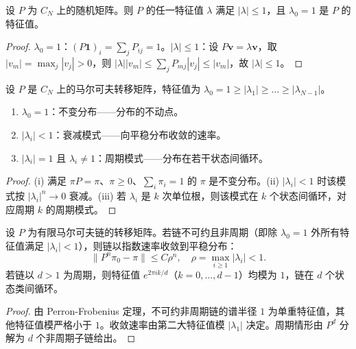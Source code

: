 \begin{lemma}[随机矩阵特征值的谱半径界]\label{ch14_transition_spectral_radius}
设 $P$ 为 $C_N$ 上的随机矩阵。则 $P$ 的任一特征值 $\lambda$ 满足 $|\lambda| \le 1$，且 $\lambda_0 = 1$ 是 $P$ 的特征值。
\end{lemma}

\begin{proof}
$\lambda_0 = 1$：$(P\mathbf{1})_i = \sum_j P_{ij} = 1$。$|\lambda| \le 1$：设 $P\mathbf{v} = \lambda\mathbf{v}$，取 $|v_m| = \max_j |v_j| > 0$，则 $|\lambda||v_m| \le \sum_j P_{mj}|v_j| \le |v_m|$，故 $|\lambda| \le 1$。
\end{proof}

\begin{proposition}[转移算子与特征值分解]\label{prop:transfer_operator_eigen}
设 $P$ 是 $C_N$ 上的马尔可夫转移矩阵，特征值为 $\lambda_0 = 1 \ge |\lambda_1| \ge \dots \ge |\lambda_{N-1}|$。
\begin{enumerate}[label=(\roman*)]
    \item $\lambda_0 = 1$：不变分布——分布的不动点。
    \item $|\lambda_i| < 1$：衰减模式——向平稳分布收敛的速率。
    \item $|\lambda_i| = 1$ 且 $\lambda_i \neq 1$：周期模式——分布在若干状态间循环。
\end{enumerate}
\end{proposition}

\begin{proof}
(i) 满足 $\pi P = \pi$、$\pi \ge 0$、$\sum_i \pi_i = 1$ 的 $\pi$ 是不变分布。(ii) $|\lambda_i| < 1$ 时该模式按 $|\lambda_i|^n \to 0$ 衰减。(iii) 若 $\lambda_i$ 是 $k$ 次单位根，则该模式在 $k$ 个状态间循环，对应周期 $k$ 的周期模式。
\end{proof}

\begin{proposition}[不可约马尔可夫链的周期]\label{prop:markov_chain_period}
设 $P$ 为有限马尔可夫链的转移矩阵。若链不可约且非周期（即除 $\lambda_0=1$ 外所有特征值满足 $|\lambda_i|<1$），则链以指数速率收敛到平稳分布：
\[
\|P^n \pi_0 - \pi\| \le C \rho^n, \quad \rho = \max_{i \ge 1} |\lambda_i| < 1.
\]
若链以 $d > 1$ 为周期，则特征值 $e^{2\pi i k/d}$（$k=0,\dots,d-1$）均模为 $1$，链在 $d$ 个状态类间循环。
\end{proposition}

\begin{proof}
由 Perron-Frobenius 定理，不可约非周期链的谱半径 $1$ 为单重特征值，其他特征值模严格小于 $1$。收敛速率由第二大特征值模 $|\lambda_1|$ 决定。周期情形由 $P^d$ 分解为 $d$ 个非周期子链给出。
\end{proof}

